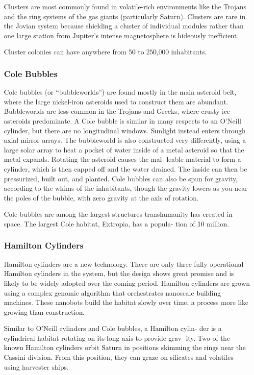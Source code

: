 Clusters are most commonly found in volatile-rich environments 
like the Trojans and the ring systems of the gas giants (particularly 
Saturn). Clusters are rare in the Jovian system because shielding a 
cluster of individual modules rather than one large station from 
Jupiter's intense magnetosphere is hideously inefficient.

Cluster colonies can have anywhere from 50 to 250,000 inhabitants.

\subsubsection{Cole Bubbles}

Cole bubbles (or ``bubbleworlds'') are found mostly in the main 
asteroid belt, where the large nickel-iron asteroids used to construct 
them are abundant. Bubbleworlds are less common in the Trojans 
and Greeks, where crusty ice asteroids predominate. A Cole bubble 
is similar in many respects to an O'Neill cylinder, but there are no 
longitudinal windows. Sunlight instead enters through axial mirror 
arrays. The bubbleworld is also constructed very differently, using a 
large solar array to heat a pocket of water inside of a metal asteroid 
so that the metal expands. Rotating the asteroid causes the mal-
leable material to form a cylinder, which is then capped off and the 
water drained. The inside can then be pressurized, built out, and 
planted. Cole bubbles can also be spun for gravity, according to the 
whims of the inhabitants, though the gravity lowers as you near the 
poles of the bubble, with zero gravity at the axis of rotation.

Cole bubbles are among the largest structures transhumanity has 
created in space. The largest Cole habitat, Extropia, has a popula-
tion of 10 million.

\subsubsection{Hamilton Cylinders}

Hamilton cylinders are a new technology. There are only three fully 
operational Hamilton cylinders in the system, but the design shows 
great promise and is likely to be widely adopted over the coming 
period. Hamilton cylinders are grown using a complex genomic 
algorithm that orchestrates nanoscale building machines. These 
nanobots build the habitat slowly over time, a process more like 
growing than construction.

Similar to O'Neill cylinders and Cole bubbles, a Hamilton cylin-
der is a cylindrical habitat rotating on its long axis to provide grav-
ity. Two of the known Hamilton cylinders orbit Saturn in positions 
skimming the rings near the Cassini division. From this position, 
they can graze on silicates and volatiles using harvester ships.


